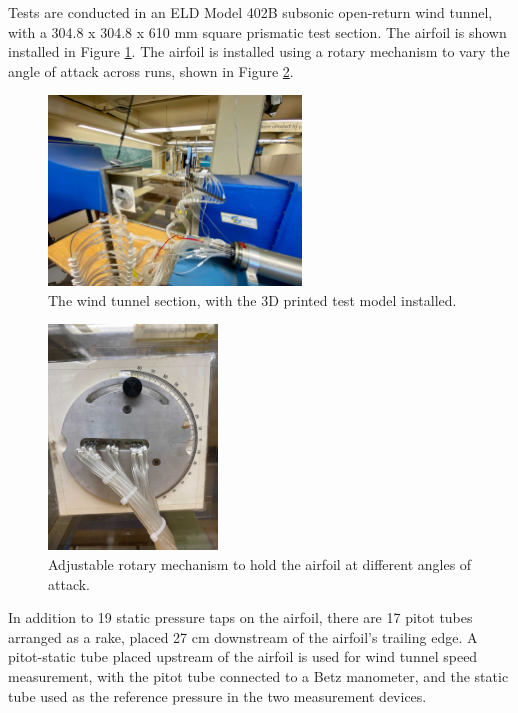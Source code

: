 \documentclass[runningheads]{llncs}
\begin{document}
\noindent
Tests are conducted in an ELD Model 402B subsonic open-return wind tunnel, with a 304.8 x 304.8 x 610 mm  square prismatic test section. The airfoil is shown installed in Figure \ref{fig:wind_tunnel_setup}. The airfoil is installed using a rotary mechanism to vary the angle of attack across runs, shown in Figure \ref{fig:aoa_select}.\newline

\begin{figure}
    \centering
    \includegraphics[width=0.6\textwidth]{Apparatus Pictures/wind_tunnel_setup.jpg}
    \caption{The wind tunnel section, with the 3D printed test model installed.}
    \label{fig:wind_tunnel_setup}
\end{figure}

\begin{figure}
    \centering
    \includegraphics[width=0.4\textwidth]{Apparatus Pictures/aoa_selector.jpg}
    \caption{Adjustable rotary mechanism to hold the airfoil at different angles of attack.}
    \label{fig:aoa_select}
\end{figure}

\noindent
In addition to 19 static pressure taps on the airfoil, there are 17 pitot tubes arranged as a rake, placed 27 cm downstream of the airfoil's trailing edge. A pitot-static tube placed upstream of the airfoil is used for wind tunnel speed measurement, with the pitot tube connected to a Betz manometer, and the static tube used as the reference pressure in the two measurement devices.\newline
\end{document}
